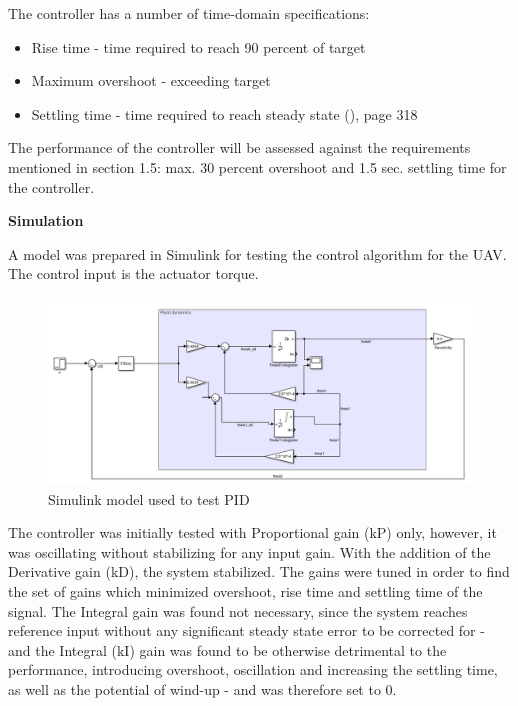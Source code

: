The controller has a number of time-domain specifications:

\begin{itemize}
\item Rise time - time required to reach 90 percent of target
\item Maximum overshoot - exceeding target
\item Settling time - time required to reach steady state (\cite{de2012spacecraft}), page 318
\end{itemize}

The performance of the controller will be assessed against the requirements mentioned in section 1.5: max. 30 percent overshoot and 1.5 sec. settling time for the controller. 


\textbf{Simulation}

A model was prepared in Simulink for testing the control algorithm for the UAV. 
The control input is the actuator torque.

\begin{figure}[H]
    \centering
    \includegraphics[scale=0.6]{graphics/Control/Simulink.png}
    \caption{Simulink model used to test PID}
     \label{Simulink Model Used to Test PID control}
\end{figure} 

The controller was initially tested with Proportional gain (kP) only, however, it was oscillating without stabilizing for any input gain. With the addition of the Derivative gain (kD), the system stabilized. The gains were tuned in order to find the set of gains which minimized overshoot, rise time and settling time of the signal. The Integral gain was found not necessary, since the system reaches reference input without any significant steady state error to be corrected for - and the Integral (kI) gain was found to be otherwise detrimental to the performance, introducing overshoot, oscillation and increasing the settling time, as well as the potential of wind-up - and was therefore set to 0. 

